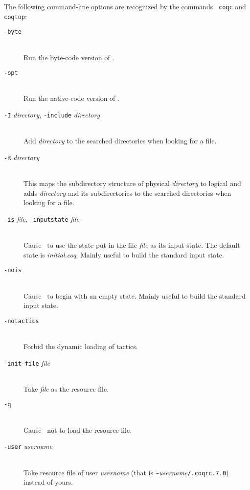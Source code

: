 The following command-line options are recognized by the commands {\tt
  coqc} and {\tt coqtop}:

\begin{description}
\item[{\tt -byte}]\ \\
  Run the byte-code version of \Coq{}.

\item[{\tt -opt}]\ \\
  Run the native-code version of \Coq{}.

\item[{\tt -I} {\em directory}, {\tt -include} {\em directory}]\ \\
  Add {\em directory} to the searched directories when looking for a
  file.

\item[{\tt -R} {\em directory} {\dirpath}]\ \\
  This maps the subdirectory structure of physical {\em directory} to
  logical {\dirpath} and adds {\em directory} and its subdirectories
  to the searched directories when looking for a file.

\item[{\tt -is} {\em file}, {\tt -inputstate} {\em file}]\ \\
  Cause \Coq~to use the state put in the file {\em file} as its input
  state. The default state is {\em initial.coq}.
  Mainly useful to build the standard input state.

\item[{\tt -nois}]\ \\
  Cause \Coq~to begin with an empty state. Mainly useful to build the
  standard input state.

\item[{\tt -notactics}]\ \\
  Forbid the dynamic loading of tactics.

\item[{\tt -init-file} {\em file}]\ \\
  Take {\em file} as the resource file.

\item[{\tt -q}]\ \\
  Cause \Coq~not to load the resource file.

\item[{\tt -user} {\em username}]\ \\
  Take resource file of user {\em username} (that is 
  \verb+~+{\em username}{\tt /.coqrc.7.0}) instead of yours.


\end{description}

